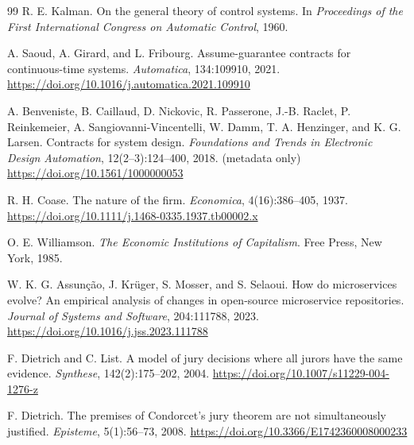 \begin{thebibliography}{99}
R. E. Kalman.
\newblock On the general theory of control systems.
\newblock In \emph{Proceedings of the First International Congress on Automatic
Control}, 1960.


A. Saoud, A. Girard, and L. Fribourg.
\newblock Assume-guarantee contracts for continuous-time systems.
\newblock \emph{Automatica}, 134:109910, 2021.
\newblock \url{https://doi.org/10.1016/j.automatica.2021.109910}

A. Benveniste, B. Caillaud, D. Nickovic, R. Passerone, J.-B. Raclet, P. Reinkemeier,
A. Sangiovanni-Vincentelli, W. Damm, T. A. Henzinger, and K. G. Larsen.
\newblock Contracts for system design.
\newblock \emph{Foundations and Trends in Electronic Design Automation},
12(2--3):124--400, 2018. (metadata only)
\newblock \url{https://doi.org/10.1561/1000000053}

R. H. Coase.
\newblock The nature of the firm.
\newblock \emph{Economica}, 4(16):386--405, 1937.
\newblock \url{https://doi.org/10.1111/j.1468-0335.1937.tb00002.x}

O. E. Williamson.
\newblock \emph{The Economic Institutions of Capitalism}.
\newblock Free Press, New York, 1985.

W. K. G. Assun{\c c}{\~a}o, J. Kr{\"u}ger, S. Mosser, and S. Selaoui.
\newblock How do microservices evolve? An empirical analysis of changes in
open-source microservice repositories.
\newblock \emph{Journal of Systems and Software}, 204:111788, 2023.
\newblock \url{https://doi.org/10.1016/j.jss.2023.111788}

F. Dietrich and C. List.
\newblock A model of jury decisions where all jurors have the same evidence.
\newblock \emph{Synthese}, 142(2):175--202, 2004.
\newblock \url{https://doi.org/10.1007/s11229-004-1276-z}

F. Dietrich.
\newblock The premises of Condorcet's jury theorem are not simultaneously
justified.
\newblock \emph{Episteme}, 5(1):56--73, 2008.
\newblock \url{https://doi.org/10.3366/E1742360008000233}


\end{thebibliography}
